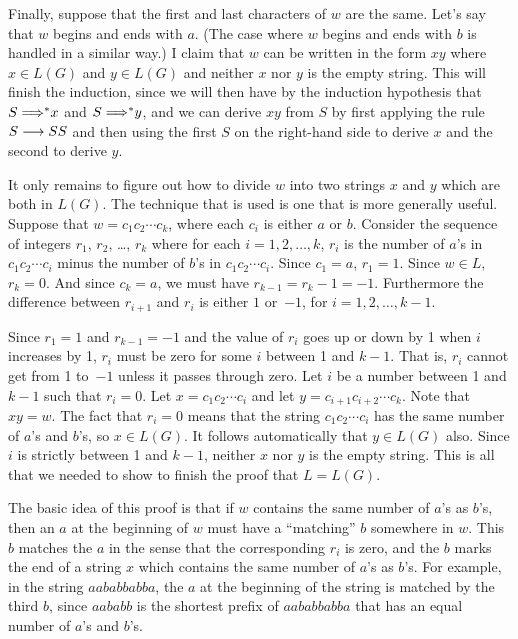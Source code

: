 Finally, suppose that the first and last characters of $w$ are
the same.  Let's say that $w$ begins and ends with $a$.  (The case
where $w$ begins and ends with $b$ is handled in a similar way.)
I claim that $w$ can be written in the form $xy$ where $x\in L(G)$
and $y\in L(G)$ and neither $x$ nor $y$ is the empty string.
This will finish the induction, since we will then have by
the induction hypothesis that $S\;{\Longrightarrow}^* x$
and $S\;{\Longrightarrow}^* y$, and we can derive $xy$ from $S$ by first
applying the rule $S\longrightarrow SS$ and then using the first
$S$ on the right-hand side to derive $x$ and the second to derive $y$.

It only remains to figure out how to divide $w$ into two strings
$x$ and $y$ which are both in $L(G)$.  The technique that is used
is one that is more generally useful.  Suppose that $w=c_1c_2\cdots c_k$,
where each $c_i$ is either $a$ or $b$.  Consider the sequence of
integers $r_1$, $r_2$, \dots, $r_k$ where for each $i = 1, 2, \dots, k$,
$r_i$ is the number of $a$'s in $c_1c_2\cdots c_i$ minus the
number of $b$'s in $c_1c_2\cdots c_i$.  Since $c_1=a$, $r_1=1$.
Since $w\in L$, $r_k=0$.  And since $c_k=a$, we must have $r_{k-1}=
r_k-1 = -1$.  Furthermore the difference between $r_{i+1}$
and $r_i$ is either $1$ or~$-1$, for $i=1,2,\dots,k-1$.

Since $r_1=1$ and $r_{k-1}=-1$ and the value of $r_i$ goes up or down
by 1 when $i$ increases by 1, $r_i$ must be zero for some $i$
between 1 and $k-1$.  That is, $r_i$ cannot get from 1 to~$-1$ unless
it passes through zero. Let $i$ be a number between 1 and $k-1$ such
that $r_i=0$.  Let $x=c_1c_2\cdots c_i$ and let $y=c_{i+1}c_{i+2}\cdots c_k$.
Note that $xy=w$.  The fact that $r_i=0$ means that 
the string $c_1c_2\cdots c_i$ has the same number of $a$'s and
$b$'s, so $x\in L(G)$.  It follows automatically that $y\in L(G)$
also.  Since $i$ is strictly between 1 and $k-1$, neither $x$ nor
$y$ is the empty string.  This is all that we needed to show
to finish the proof that $L=L(G)$.

The basic idea of this proof is that if $w$ contains the same 
number of $a$'s as $b$'s, then an $a$ at the beginning
of $w$ must have a ``matching'' $b$ somewhere in $w$.  This
$b$ matches the $a$ in the sense that the corresponding $r_i$ is
zero, and the $b$ marks the end of a string $x$ which contains
the same number of $a$'s as $b$'s.  For example, in the
string $aababbabba$, the $a$ at the beginning of the string
is matched by the third $b$, since $aababb$ is the shortest
prefix of $aababbabba$ that has an equal number of $a$'s
and $b$'s.

